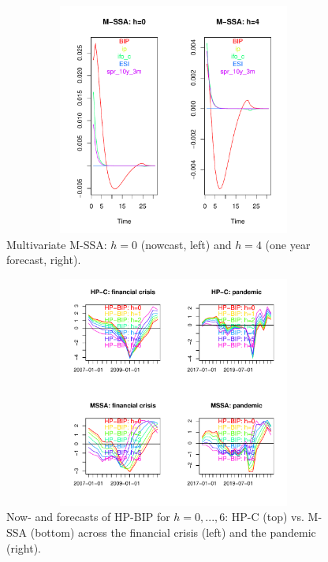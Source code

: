 \documentclass[a4paper]{article}
\begin{document}
\begin{figure}[H]\begin{center}\includegraphics[height=3in, width=4.5in]{./Figures/bk_h.pdf}\caption{Multivariate M-SSA: $h=0$ (nowcast, left) and $h=4$ (one year forecast, right).\label{bk_h}}\end{center}\end{figure}\begin{figure}[H]\begin{center}\includegraphics[height=3in, width=4.5in]{./Figures/multivar_vs_univar.pdf}\caption{Now- and forecasts of HP-BIP for $h=0,...,6$: HP-C (top) vs. M-SSA (bottom) across the financial crisis (left) and the pandemic (right).\label{multivar_vs_univar}}\end{center}\end{figure}
\end{document}
